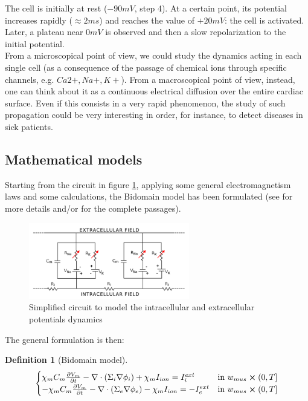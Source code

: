 \documentclass[a4paper,12pt]{article}
\newtheorem{definition}{Definition}
\begin{document}
    \noindent The cell is initially at rest ($-90mV$, step 4). At a certain point, its potential increases rapidly ($\approx2ms$) and reaches the value of $+20mV$: the cell is activated. Later, a plateau near $0mV$ is observed and then a slow repolarization to the initial potential. \\
    From a microscopical point of view, we could study the dynamics acting in each single cell (as a consequence of the passage of chemical ions through specific channels, e.g. $Ca2+,Na+,K+$). From a macroscopical point of view, instead, one can think about it as a continuous electrical diffusion over the entire cardiac surface. Even if this consists in a very rapid phenomenon, the study of such propagation could be very interesting in order, for instance, to detect diseases in sick patients.
    
    \subsection{Mathematical models}
    Starting from the circuit in figure \ref{electrical_circuit}, applying some general electromagnetism laws and some calculations, the Bidomain model has been formulated (see \parencite{acta} for more details and/or \parencite{colli_franzone} for the complete passages).
    
    \begin{figure}[h]
    	\begin{center}
    		\includegraphics[width = 7cm]{./electrical_circuit.png}
    		\caption{Simplified circuit to model the intracellular and extracellular potentials dynamics}
    		\label{electrical_circuit}
    	\end{center}
    \end{figure}
    
    \noindent The general formulation is then: \vspace{3mm}
    \begin{definition}[Bidomain model]
	\begin{equation*}
	\begin{cases}
	\chi_m C_m\pdv{V_m}{t} - \nabla \cdot (\Sigma_i \nabla \phi_i) + \chi_m I_{ion} = I_i^{ext}    & \text{in } w_{mus} \cross (0,T]
	\\
	-\chi_m C_m\pdv{V_m}{t} - \nabla \cdot (\Sigma_e \nabla \phi_e) - \chi_m I_{ion} = -I_e^{ext}    & \text{in } w_{mus} \cross (0,T]
	\end{cases}
	\end{equation*}
    \end{definition}
	\vspace{3mm}
	
\end{document}
